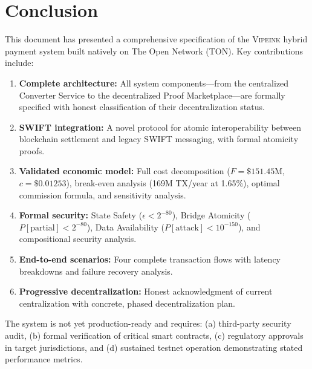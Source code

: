 \documentclass[12pt,a4paper]{article}
\theoremstyle{definition}
\theoremstyle{remark}
\newcommand{\Vipeink}{\textsc{Vipeink}}
\newcommand{\USD}[1]{\$#1}
\begin{document}
\section{Conclusion}
\label{sec:conclusion}

This document has presented a comprehensive specification of the \Vipeink{} hybrid payment system built natively on The Open Network (TON). Key contributions include:

\begin{enumerate}[nosep]
    \item \textbf{Complete architecture:} All system components---from the centralized Converter Service to the decentralized Proof Marketplace---are formally specified with honest classification of their decentralization status.
    \item \textbf{SWIFT integration:} A novel protocol for atomic interoperability between blockchain settlement and legacy SWIFT messaging, with formal atomicity proofs.
    \item \textbf{Validated economic model:} Full cost decomposition ($F = \USD{151.45\text{M}}$, $c = \USD{0.01253}$), break-even analysis (169M TX/year at 1.65\%), optimal commission formula, and sensitivity analysis.
    \item \textbf{Formal security:} State Safety ($\epsilon < 2^{-80}$), Bridge Atomicity ($P[\text{partial}] < 2^{-80}$), Data Availability ($P[\text{attack}] < 10^{-150}$), and compositional security analysis.
    \item \textbf{End-to-end scenarios:} Four complete transaction flows with latency breakdowns and failure recovery analysis.
    \item \textbf{Progressive decentralization:} Honest acknowledgment of current centralization with concrete, phased decentralization plan.
\end{enumerate}

The system is not yet production-ready and requires: (a) third-party security audit, (b) formal verification of critical smart contracts, (c) regulatory approvals in target jurisdictions, and (d) sustained testnet operation demonstrating stated performance metrics.


\appendix
\end{document}
